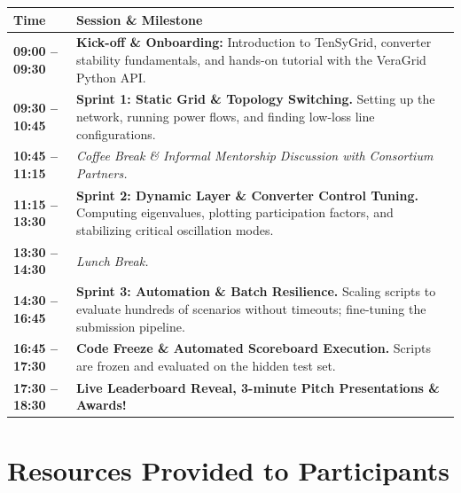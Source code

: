 \documentclass[11pt,a4paper]{article}
\begin{document}
\begin{table}[H]
  \centering
  \small
  \begin{tabularx}{\textwidth}{lX}
    \toprule
    \textbf{\color{tgblue}Time} & \textbf{\color{tgblue}Session \& Milestone} \\
    \midrule
    \textbf{09:00 -- 09:30} & \textbf{Kick-off \& Onboarding:} Introduction to TenSyGrid, converter stability fundamentals, and hands-on tutorial with the VeraGrid Python API. \\
    \textbf{09:30 -- 10:45} & \textbf{Sprint 1: Static Grid \& Topology Switching.} Setting up the network, running power flows, and finding low-loss line configurations. \\
    \textbf{10:45 -- 11:15} & \textit{\color{tgpetrol}Coffee Break \& Informal Mentorship Discussion with Consortium Partners.} \\
    \textbf{11:15 -- 13:30} & \textbf{Sprint 2: Dynamic Layer \& Converter Control Tuning.} Computing eigenvalues, plotting participation factors, and stabilizing critical oscillation modes. \\
    \textbf{13:30 -- 14:30} & \textit{\color{tgpetrol}Lunch Break.} \\
    \textbf{14:30 -- 16:45} & \textbf{Sprint 3: Automation \& Batch Resilience.} Scaling scripts to evaluate hundreds of scenarios without timeouts; fine-tuning the submission pipeline. \\
    \textbf{16:45 -- 17:30} & \textbf{Code Freeze \& Automated Scoreboard Execution.} Scripts are frozen and evaluated on the hidden test set. \\
    \textbf{17:30 -- 18:30} & \textbf{Live Leaderboard Reveal, 3-minute Pitch Presentations \& Awards!} \\
    \bottomrule
  \end{tabularx}
\end{table}

\section{Resources Provided to Participants}
\end{document}
